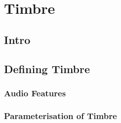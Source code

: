\chapter{Timbre}

\section{Intro}

\section{Defining Timbre}
	\subsection{Audio Features}

	\subsection{Parameterisation of Timbre}
